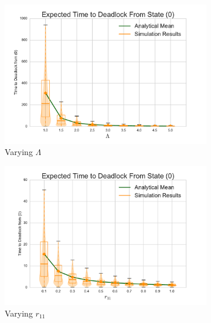 \documentclass{article}
\numberwithin{equation}{section}
\begin{document}
\begin{figure}[!htbp]
\begin{center}
\begin{subfigure}[b]{0.35\textwidth}
  \includegraphics[width=\textwidth]{images/varyL}
  \caption{Varying $\Lambda$}
  \label{fig:timestodeadlock_L}
\end{subfigure}
\begin{subfigure}[b]{0.35\textwidth}
  \includegraphics[width=\textwidth]{images/varyr11}
  \caption{Varying $r_{11}$}
  \label{fig:timestodeadlock_r11}
\end{subfigure}\\
\begin{subfigure}[b]{0.35\textwidth}

\end{subfigure}
\end{center}
\end{figure}
\end{document}
